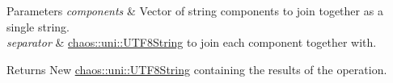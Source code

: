 \begin{DoxyParams}{Parameters}
{\em components} & Vector of string components to join together as a single string. \\
\hline
{\em separator} & \hyperlink{classchaos_1_1uni_1_1_u_t_f8_string}{chaos\-::uni\-::\-U\-T\-F8\-String} to join each component together with. \\
\hline
\end{DoxyParams}
\begin{DoxyReturn}{Returns}
New \hyperlink{classchaos_1_1uni_1_1_u_t_f8_string}{chaos\-::uni\-::\-U\-T\-F8\-String} containing the results of the operation. 
\end{DoxyReturn}
